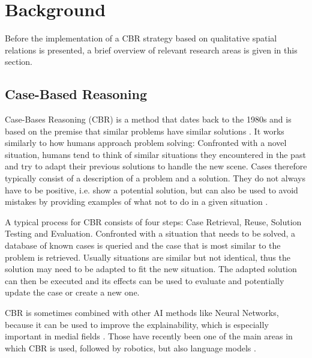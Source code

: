\section{Background}\label{sec:background}

Before the implementation of a \ac{CBR} strategy based on qualitative spatial relations is presented, a brief overview of relevant research areas is given in this section.

\subsection{Case-Based Reasoning}
Case-Bases Reasoning (CBR) is a method that dates back to the 1980s \cite{Schank1983DynamicM} and is based on the premise that similar problems have similar solutions \cite{KI-cbr-2009}.
It works similarly to how humans approach problem solving: Confronted with a novel situation, humans tend to think of similar situations they encountered in the past and try to adapt their previous solutions to handle the new scene.
Cases therefore typically consist of a description of a problem and a solution.
They do not always have to be positive, i.e. show a potential solution, but can also be used to avoid mistakes by providing examples of what not to do in a given situation \cite{Kolodner1992}.

A typical process for \ac{CBR} consists of four steps: Case Retrieval, Reuse, Solution Testing and Evaluation.\cite{CBR-issues-variations-approaches}
Confronted with a situation that needs to be solved, a database of known cases is queried and the case that is most similar to the problem is retrieved.
Usually situations are similar but not identical, thus the solution may need to be adapted to fit the new situation.
The adapted solution can then be executed and its effects can be used to evaluate and potentially update the case or create a new one.


\ac{CBR} is sometimes combined with other AI methods like Neural Networks, because it can be used to improve the explainability, which is especially important in medial fields \cite{expl-1amador2021case,expl-210.1007/978-3-030-58342-2_22,explainable-https://doi.org/10.48550/arxiv.1710.04806}.
Those have recently been one of the main areas in which CBR is used\cite{medical1, medical2}, followed by robotics\cite{QCBR}, but also language models \cite{text, text2}.

